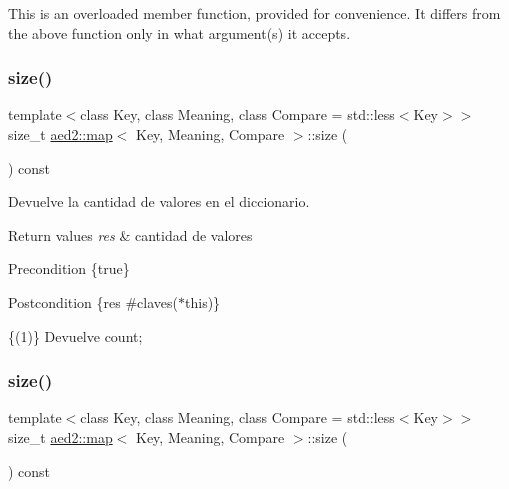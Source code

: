 This is an overloaded member function, provided for convenience. It differs from the above function only in what argument(s) it accepts. \mbox{\label{classaed2_1_1map_aa6e806b3be6dc0da79adbfae08b571bf}} 
\subsubsection{\texorpdfstring{size()}{size()}\hspace{0.1cm}{\footnotesize\ttfamily [1/2]}}
{\footnotesize\ttfamily template$<$class Key, class Meaning, class Compare = std\+::less$<$\+Key$>$$>$ \\
size\+\_\+t \hyperlink{classaed2_1_1map}{aed2\+::map}$<$ Key, Meaning, Compare $>$\+::size (\begin{DoxyParamCaption}{ }\end{DoxyParamCaption}) const\hspace{0.3cm}{\ttfamily [inline]}}



Devuelve la cantidad de valores en el diccionario. 


\begin{DoxyRetVals}{Return values}
{\em res} & cantidad de valores\\
\hline
\end{DoxyRetVals}
\begin{DoxyPrecond}{Precondition}
\{true\} 
\end{DoxyPrecond}
\begin{DoxyPostcond}{Postcondition}
\{res  \#claves($\ast$this)\}
\end{DoxyPostcond}
\{(1)\} Devuelve count; \mbox{\label{classaed2_1_1map_aa6e806b3be6dc0da79adbfae08b571bf}} 
\subsubsection{\texorpdfstring{size()}{size()}\hspace{0.1cm}{\footnotesize\ttfamily [2/2]}}
{\footnotesize\ttfamily template$<$class Key, class Meaning, class Compare = std\+::less$<$\+Key$>$$>$ \\
size\+\_\+t \hyperlink{classaed2_1_1map}{aed2\+::map}$<$ Key, Meaning, Compare $>$\+::size (\begin{DoxyParamCaption}{ }\end{DoxyParamCaption}) const\hspace{0.3cm}{\ttfamily [inline]}}



